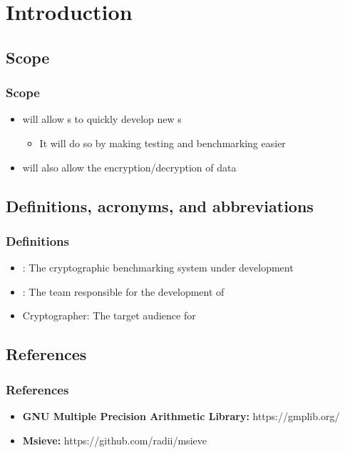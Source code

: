 
\section{Introduction}


\subsection{Scope}

\begin{frame}
\frametitle{Scope}
\begin{itemize}
\item \cry{} will allow \cg s to quickly develop new \cs{}s
\begin{itemize}
  \item It will do so by making testing and benchmarking
  easier
\end{itemize}
\item \cry{} will also allow the encryption/decryption of
data
\end{itemize}
\end{frame}


\subsection{Definitions, acronyms, and abbreviations}

\begin{frame}
\frametitle{Definitions}
\begin{itemize}
\item \cry{}: The cryptographic benchmarking system
under development
\item \tc{}: The team responsible for the
development of \cry{}
\item Cryptographer: The target audience for \cry{}
\end{itemize}
\end{frame}


\subsection{References}

\begin{frame}
\frametitle{References}
\begin{itemize}
  \item \textbf{GNU Multiple Precision Arithmetic Library:}
        https://gmplib.org/
  \item \textbf{Msieve:} https://github.com/radii/msieve
\end{itemize}
\end{frame}

